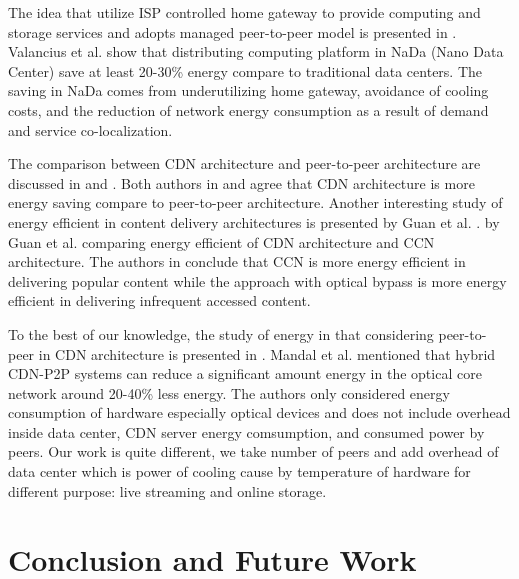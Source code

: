 \documentclass[conference]{IEEEtran}
\begin{document}
The idea that utilize ISP controlled home gateway to provide computing and storage services and adopts managed peer-to-peer model is presented in \cite{valancius2009greening}. 
Valancius et al. \cite{valancius2009greening} show that distributing computing platform in NaDa (Nano Data Center) save at least 20-30\% energy compare to traditional data centers.
The saving in NaDa comes from underutilizing home gateway, avoidance of cooling costs, and the reduction of network energy consumption as a result of demand and service co-localization.

The comparison between CDN architecture and peer-to-peer architecture are discussed in \cite{baliga2007energy} and \cite{feldmann2010energy}.
Both authors in \cite{baliga2007energy} and \cite{feldmann2010energy} agree that CDN architecture is more energy saving compare to peer-to-peer architecture. 
Another interesting study of energy efficient in content delivery architectures is presented by Guan et al. \cite{5963557}.
by Guan et al. \cite{5963557} comparing energy efficient of CDN architecture and CCN architecture.
The authors in \cite{5963557} conclude that CCN is more energy efficient in delivering popular content while the approach with optical bypass is more energy efficient in delivering infrequent accessed content.

To the best of our knowledge, the study of energy in that considering peer-to-peer in CDN architecture is presented in \cite{6524219}.
Mandal et al. \cite{6524219} mentioned that hybrid CDN-P2P systems can reduce a significant amount energy in the optical core network around 20-40\% less energy.  
The authors only considered energy consumption of hardware especially optical devices and does not include overhead inside data center, CDN server energy comsumption, and consumed power by peers.
Our work is quite different, we take number of peers and add overhead of data center which is power of cooling cause by temperature of hardware for different purpose: live streaming and online storage.

\section{Conclusion and Future Work}\label{conclusion}
\end{document}
